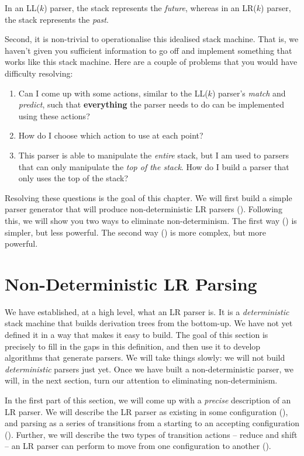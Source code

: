 In an LL($k$) parser, the stack represents the \textit{future}, whereas in an LR($k$) parser, the stack represents the \textit{past}.

Second, it is non-trivial to operationalise this idealised stack machine. That is, we haven't given you sufficient information to go off and implement something that works like this stack machine. Here are a couple of problems that you would have difficulty resolving:

\begin{enumerate}
    \item Can I come up with some actions, similar to the LL($k$) parser's \textit{match} and \textit{predict}, such that \textbf{everything} the parser needs to do can be implemented using these actions?
    \item How do I choose which action to use at each point?
    \item This parser is able to manipulate the \textit{entire} stack, but I am used to parsers that can only manipulate the \textit{top of the stack}. How do I build a parser that only uses the top of the stack?
\end{enumerate}

Resolving these questions is the goal of this chapter. We will first build a simple parser generator that will produce non-deterministic LR parsers (). Following this, we will show you two ways to eliminate non-determinism. The first way () is simpler, but less powerful. The second way () is more complex, but more powerful.


\section{Non-Deterministic LR Parsing}\label{section:lr-basics}
We have established, at a high level, what an LR parser is. It is a \textit{deterministic} stack machine that builds derivation trees from the bottom-up. We have not yet defined it in a way that makes it easy to build. The goal of this section is precisely to fill in the gaps in this definition, and then use it to develop algorithms that generate parsers. We will take things slowly: we will not build \textit{deterministic} parsers just yet. Once we have built a non-deterministic parser, we will, in the next section, turn our attention to eliminating non-determinism. 

In the first part of this section, we will come up with a \textit{precise} description of an LR parser. We will describe the LR parser as existing in some configuration (), and parsing as a series of transitions from a starting to an accepting configuration (). Further, we will describe the two types of transition actions -- reduce and shift -- an LR parser can perform to move from one configuration to another ().

